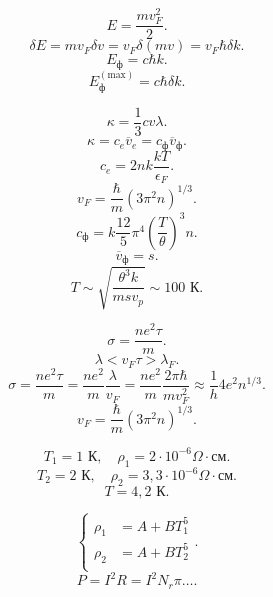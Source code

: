 \documentclass[a4paper]{article}
\begin{document}
\begin{hiProb}[Т5-1?]
\end{hiProb}
\begin{sol}
\begin{figure}[ht]
    \centering
    \caption{}
    \label{fig:2}
\end{figure}
\[
E= \frac{mv_F^2}{2}
.\] 
\[
	\delta E = m v_F \delta v= v_F \delta (m v)= v_F \hbar \delta k
.\] 
\[
E_\text{ф}= c\hbar k
.\] 
\[
	E_\text{ф} ^{(\text{max})}=c \hbar \delta k
.\] 
\end{sol}
\begin{hiProb}[3.74]
\end{hiProb}
\begin{sol}
	\[
	\kappa = \frac{1}{3}c v \lambda
	.\] 
	\[
	\kappa= c_e \overline{v}_e = c_\text{ф} \overline{v}_\text{ф}
	.\] 
	\[
	c_e= 2nk \frac{kT}{\epsilon_F}
	.\] 
	\[
		v_F= \frac{\hbar }{m} (3\pi^2 n)^{1 /3}
	.\] 
	\[
		c_\text{ф}= k \frac{12}{5} \pi^4 \left( \frac{T}{\theta} \right) ^3 n
	.\] 
	\[
	\overline{v}_\text{ф}=s
	.\] 
	\[
	T \sim \sqrt{ \frac{\theta^3 k}{ms v_p}} \sim  100 \text{ К}
	.\] 
\end{sol}
\begin{hiProb}[3.88]
\end{hiProb}
\begin{sol}
\[
	\sigma= \frac{ne^{2}\tau}{m} 
.\]
\[
\lambda < v_F \tau>\lambda_F
.\] 
\[
\sigma= \frac{ne^2\tau}{m}= \frac{ne^2}{m} \frac{\lambda}{v_F}=
\frac{ne^2}{m} \frac{2\pi\hbar }{m v_F^2} \approx \frac{1}{h}
4e^2 n^{1 /3}
.\] 
\[
	v_F=\frac{\hbar}{m} (3\pi^2 n)^{1 /3}
.\] 
\end{sol}
\begin{hiProb}
\[
T_1=1 \text{ К}, \quad \rho_1=2 \cdot 10^{-6} \Omega\cdot\text{см}
.\] 
\[
T_2= 2 \text{ К},\quad \rho_2= 3,3 \cdot 10^{-6} \Omega \cdot \text{см}
.\] 
\[
T=4,2 \text{ К}
.\] 
\end{hiProb}
\begin{sol}
\[
\left\{
\begin{aligned}
\rho_1 &= A+BT_1^5 \\
\rho_2 &= A+B T_2^5 \\
\end{aligned}
\right.
.\] 
\[
P=I^2 R= I^2 N_r \pi\ldots
.\] 
\end{sol}
\end{document}

